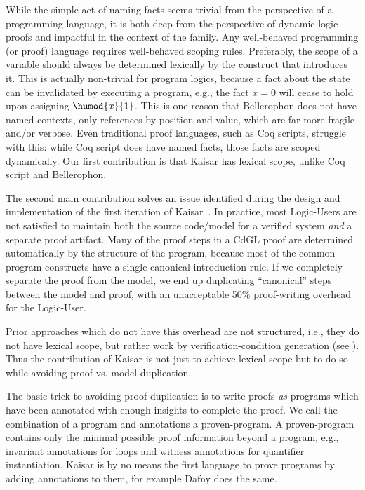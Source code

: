 \documentclass[12pt]{cmuthesis}
\theoremstyle{definition}
\theoremstyle{remark}
\newcommand{\rref}[2][]{\prettyref{#2}}
\newcommand{\CdGL}{\textsf{CdGL}\xspace}
\begin{document}
While the simple act of naming facts seems trivial from the perspective of a programming language, it is both deep from the perspective of dynamic logic proofs and impactful in the context of the \dL family.
Any well-behaved programming (or proof) language requires well-behaved scoping rules.
Preferably, the scope of a variable should always be determined lexically by the construct that introduces it.
This is actually non-trivial for program logics, because a fact about the state can be invalidated by executing a program, e.g., the fact $x=0$ will cease to hold upon assigning $\humod{x}{1}$.
This is one reason that Bellerophon does not have named contexts, only references by position and value, which are far more fragile and/or verbose.
Even traditional proof languages, such as Coq scripts, struggle with this: while Coq script does have named facts, those facts are scoped dynamically.
Our first contribution is that Kaisar has lexical scope, unlike Coq script and Bellerophon.

The second main contribution solves an issue identified during the design and implementation of the first iteration of Kaisar~\cite{DBLP:journals/corr/abs-1908-05535}.
In practice, most Logic-Users are not satisfied to maintain both the source code/model for a verified system \emph{and} a separate proof artifact.
Many of the proof steps in a \CdGL proof are determined automatically by the structure of the program, because most of the common program constructs have a single canonical introduction rule.
If we completely separate the proof from the model, we end up duplicating ``canonical'' steps between the model and proof, with an unacceptable 50\% proof-writing overhead for the Logic-User.

Prior approaches which do not have this overhead are not structured, i.e., they do not have lexical scope, but rather work by verification-condition generation (see \rref{sec:kaisar-relwork}).
Thus the contribution of Kaisar is not just to achieve lexical scope but to do so while avoiding proof-vs.-model duplication.

The basic trick to avoiding proof duplication is to write proofs \emph{as} programs which have been annotated with enough insights to complete the proof.
We call the combination of a program and annotations a proven-program.
A proven-program contains only the minimal possible proof information beyond a program, e.g., invariant annotations for loops and witness annotations for quantifier instantiation.
Kaisar is by no means the first language to prove programs by adding annotations to them, for example Dafny does the same.
\end{document}
